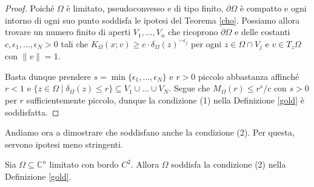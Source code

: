 \begin{proof}
    Poiché $\Omega$ è limitato, pseudoconvesso e di tipo finito, $\partial\Omega$ è compatto e ogni intorno di ogni suo punto soddisfa le ipotesi del Teorema \ref{cho}. Possiamo allora trovare un numero finito di aperti $V_1,\dots, V_n$ che ricoprono $\partial\Omega$ e delle costanti $c,\epsilon_1,\dots,\epsilon_N>0$ tali che $K_\Omega(x;v) \ge c\cdot\delta_\Omega(z)^{-\epsilon_j}$ per ogni $z\in\Omega\cap V_j$ e $v\in T_z\Omega$ con $\|v\|=1$.

    Basta dunque prendere $s=\min\{\epsilon_1,\dots,\epsilon_N\}$ e $r>0$ piccolo abbastanza affinché $r<1$ e $\{z\in\Omega\mid\delta_\Omega(z) \le r\}\subseteq V_1\cup\dots\cup V_N$. Segue che $M_\Omega(r) \le r^s/c$ con $s>0$ per $r$ sufficientemente piccolo, dunque la condizione (1) nella Definizione \ref{gold} è soddisfatta.
\end{proof}

Andiamo ora a dimostrare che soddisfano anche la condizione (2). Per questa, servono ipotesi meno stringenti.

\begin{prop}
    Sia $\Omega\subseteq\mathbb{C}^n$ limitato con bordo $C^2$. Allora $\Omega$ soddisfa la condizione (2) nella Definizione \ref{gold}.
\end{prop}

